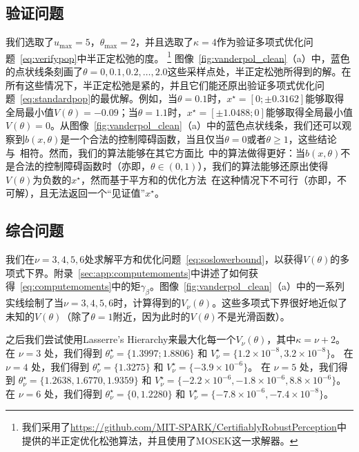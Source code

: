 \subsection{验证问题}
我们选取了$u_{\max} = 5$，$\theta_{\max} = 2$，并且选取了$\kappa = 4$作为验证多项式优化问题~\eqref{eq:verifypop}中半正定松弛的度。
\footnote{
    我们采用了\url{https://github.com/MIT-SPARK/CertifiablyRobustPerception}中提供的半正定优化松弛算法，并且使用了MOSEK这一求解器。
}
图像~\ref{fig:vanderpol_clean}（a）中，蓝色的点状线条刻画了$\theta = 0, 0.1, 0.2, \dots, 2.0$这些采样点处，半正定松弛所得到的解。在所有这些情况下，半正定松弛是紧的，并且它们能还原出验证多项式优化问题~\eqref{eq:standardpop}的最优解。例如，当$\theta = 0.1$时，$x^\star = [0; \pm 0.3162]$能够取得全局最小值$V(\theta) = -0.09$；当$\theta = 1.1$时，$x^\star = [\pm 1.0488; 0]$能够取得全局最小值$V(\theta) = 0$。从图像~\ref{fig:vanderpol_clean}（a）中的蓝色点状线条，我们还可以观察到$b(x, \theta)$是一个合法的控制障碍函数，当且仅当$\theta = 0$或者$\theta \ge 1$，这些结论与~\cite{clark22arxiv-cbf}相符。然而，我们的算法能够在其它方面比~\cite{clark22arxiv-cbf}中的算法做得更好：当$b(x, \theta)$不是合法的控制障碍函数时（亦即，$\theta \in (0, 1)$），我们的算法能够还原出使得$V(\theta)$为负数的$x^\star$，然而基于平方和的优化方法~\cite{clark22arxiv-cbf}在这种情况下不可行（亦即，不可解），且无法返回一个“见证值”$x^\star$。



\subsection{综合问题}
我们在$\nu = 3, 4, 5, 6$处求解平方和优化问题~\eqref{eq:soslowerbound}，以获得$V(\theta)$的多项式下界。附录~\ref{sec:app:computemoments}中讲述了如何获得~\eqref{eq:computemoments}中的矩$\gamma_\beta$。图像~\ref{fig:vanderpol_clean}（a）中的一系列实线绘制了当$\nu = 3, 4, 5, 6$时，计算得到的$V_\nu(\theta)$。这些多项式下界很好地近似了未知的$V(\theta)$（除了$\theta = 1$附近，因为此时的$V(\theta)$不是光滑函数）。

之后我们尝试使用Lasserre's Hierarchy来最大化每一个$V_\nu(\theta)$，其中$\kappa = \nu + 2$。在 $\nu=3$ 处，我们得到 $\theta_\nu^\star = \{ 1.3997;1.8806 \}$ 和 $V_\nu^\star = \{1.2\times 10^{-8},3.2 \times 10^{-8} \}$。 在 $\nu=4$ 处，我们得到 $\theta_\nu^\star = \{ 1.3275 \}$ 和 $V_\nu^\star = \{-3.9\times 10^{-6} \}$。 在 $\nu=5$ 处，我们得到 $\theta_\nu^\star = \{ 1.2638, 1.6770, 1.9359 \}$ 和 $V_\nu^\star = \{-2.2\times 10^{-6} , -1.8 \times 10^{-6}, 8.8 \times 10^{-6} \}$。 在 $\nu=6$ 处，我们得到 $\theta_\nu^\star = \{ 0,1.2280 \}$ 和 $V_\nu^\star = \{-7.8\times 10^{-6}, - 7.4\times 10^{-8}\}$。

